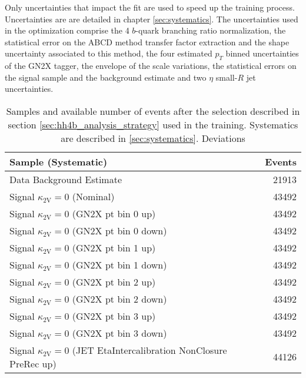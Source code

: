Only uncertainties that impact the fit are used to speed up the training process. Uncertainties are are detailed in chapter \ref{sec:systematics}. The uncertainties used in the optimization comprise the 4 $b$-quark branching ratio normalization, the statistical error on the ABCD method transfer factor extraction and the shape uncertainty associated to this method, the four estimated $p_T$ binned uncertainties of the GN2X tagger, the envelope of the scale variations, the statistical errors on the \ktwov signal sample and the background estimate and two $\eta$ small-$R$ jet uncertainties.




\begin{table}[]
    \centering
    \caption{Samples and available number of events after the selection described in section \ref{sec:hh4b_analysis_strategy} used in the training. Systematics are described in \ref{sec:systematics}. Deviations }
    \begin{tabular}{lr}
        \hline
        Sample (Systematic)                                                            & Events \\ \hline \hline
        Data Background Estimate                                                       & 21913  \\ \hline
        Signal $\kappa_\mathrm{2V}=0$ (Nominal)                                        & 43492  \\
        Signal $\kappa_\mathrm{2V}=0$ (GN2X pt bin 0 up)                               & 43492  \\
        Signal $\kappa_\mathrm{2V}=0$ (GN2X pt bin 0 down)                             & 43492  \\
        Signal $\kappa_\mathrm{2V}=0$ (GN2X pt bin 1 up)                               & 43492  \\
        Signal $\kappa_\mathrm{2V}=0$ (GN2X pt bin 1 down)                             & 43492  \\
        Signal $\kappa_\mathrm{2V}=0$ (GN2X pt bin 2 up)                               & 43492  \\
        Signal $\kappa_\mathrm{2V}=0$ (GN2X pt bin 2 down)                             & 43492  \\
        Signal $\kappa_\mathrm{2V}=0$ (GN2X pt bin 3 up)                               & 43492  \\
        Signal $\kappa_\mathrm{2V}=0$ (GN2X pt bin 3 down)                             & 43492  \\
        Signal $\kappa_\mathrm{2V}=0$ (JET EtaIntercalibration NonClosure PreRec up)   & 44126  \\

\end{tabular}
\end{table}
